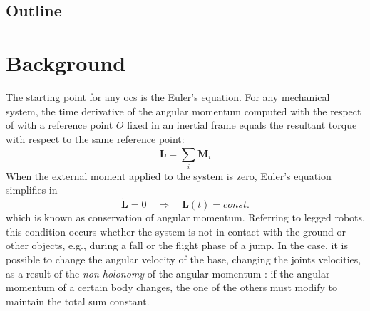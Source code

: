 \documentclass[journal,letterpaper]{IEEEtran}
\begin{document}
\subsection{Outline}
% 

\section{Background}
The starting point for any \acrshort{ocs} is the Euler's equation. For any mechanical system, the time derivative of the angular momentum computed with the respect of with a reference point $O$ fixed in an inertial frame equals
the resultant torque with respect to the same reference point:
\begin{equation}
	\dot{\bm{L}} = \sum_i \bm{M}_i
\end{equation}
When the external moment applied to the system is zero, Euler’s equation simplifies in
\begin{equation}
\dot{\bm{L}} = 0 \quad \Rightarrow \quad \bm{L}(t) = const.
\end{equation}
which is known as conservation of angular momentum.
Referring to legged robots, this condition occurs whether the system is not in contact with the ground or other objects, e.g., during a fall or the flight phase of a jump.
In the case, it is possible to change the angular velocity of the base, changing the joints velocities, as a result of the \textit{non-holonomy} of the angular momentum \cite{Wieber16}: if the angular momentum of a certain body changes, the one of the others must modify to maintain the total sum constant.
\end{document}

